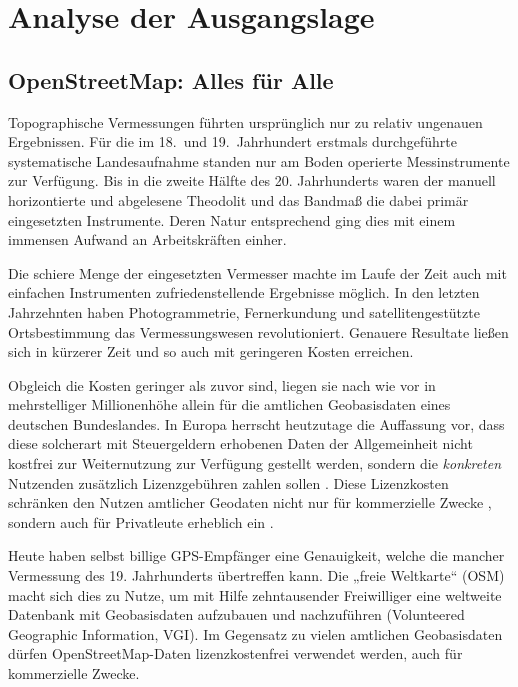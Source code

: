 \documentclass[../main/thesis.tex]{subfiles}
\begin{document}
\chapter{Analyse der Ausgangslage}

\section{OpenStreetMap: Alles für Alle}
Topographische Vermessungen führten ursprünglich nur zu relativ ungenauen Ergebnissen. 
Für die im 18.~und 19.~Jahrhundert erstmals durchgeführte systematische Landesaufnahme standen nur am Boden operierte Messinstrumente zur Verfügung.
Bis in die zweite Hälfte des 20. Jahrhunderts waren der manuell horizontierte und abgelesene Theodolit und das Bandmaß die dabei primär eingesetzten Instrumente. 
Deren Natur entsprechend ging dies mit einem immensen Aufwand an Arbeitskräften einher.

Die schiere Menge der eingesetzten Vermesser machte im Laufe der Zeit auch mit einfachen Instrumenten zufriedenstellende Ergebnisse möglich.
In den letzten Jahrzehnten haben Photogrammetrie, Fernerkundung und satellitengestützte Ortsbestimmung das Vermessungswesen revolutioniert.
Genauere Resultate ließen sich in kürzerer Zeit und so auch mit geringeren Kosten erreichen. \noref


Obgleich die Kosten geringer als zuvor sind, liegen sie nach wie vor in mehrstelliger Millionenhöhe allein für die amtlichen Geobasisdaten eines deutschen Bundeslandes. 
In Europa \noref herrscht heutzutage  die Auffassung vor, dass diese solcherart mit Steuergeldern erhobenen Daten der Allgemeinheit nicht kostfrei zur Weiternutzung zur Verfügung gestellt werden, sondern die \emph{konkreten} Nutzenden zusätzlich Lizenzgebühren zahlen sollen \noref.
Diese Lizenzkosten schränken den Nutzen amtlicher Geodaten nicht nur für kommerzielle Zwecke , sondern auch für Privatleute \noref erheblich ein \noref.


Heute haben selbst billige GPS-Empfänger eine Genauigkeit, welche die mancher Vermessung des 19. Jahrhunderts übertreffen kann. 
Die „freie Weltkarte“  (OSM)  macht sich dies zu Nutze, um mit Hilfe zehntausender Freiwilliger eine weltweite Datenbank mit Geobasisdaten aufzubauen und nachzuführen (Volunteered Geographic Information, VGI). 
Im Gegensatz zu vielen amtlichen Geobasisdaten dürfen OpenStreetMap-Daten lizenzkostenfrei verwendet werden, auch für kommerzielle Zwecke. 
\end{document}
